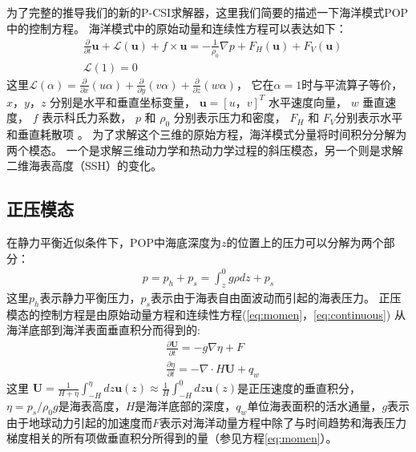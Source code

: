 为了完整的推导我们的新的P-CSI求解器，这里我们简要的描述一下海洋模式POP中的控制方程。
海洋模式中的原始动量和连续性方程可以表达如下：
\begin{align}
&\frac{\partial }{\partial t} \textbf{u} +\mathcal{L}(\textbf{u}) + f\times \textbf{u} = - \frac{1}{\rho_0}\nabla p +F_H(\textbf{u}) +F_V(\textbf{u}) \label{eq:momen}\\
&\mathcal{L}(1) = 0 \label{eq:continuous}
\end{align}
这里$\mathcal{L}(\alpha ) = \frac{\partial }{\partial x} (u\alpha)  +\frac{\partial }{\partial y} (v\alpha) +\frac{\partial }{\partial z} (w\alpha)$， 它在$\alpha =1$时与平流算子等价， $x，y，z$ 分别是水平和垂直坐标变量， $\textbf{u} = [u，v]^T$ 水平速度向量， $w$ 垂直速度， $f$ 表示科氏力系数，  $p$ 和 $\rho_0$ 分别表示压力和密度， $F_H$ 和 $F_V$分别表示水平和垂直耗散项 \citep{smith2010parallel}。  
为了求解这个三维的原始方程，海洋模式分量将时间积分分解为两个模态。 一个是求解三维动力学和热动力学过程的斜压模态，另一个则是求解二维海表高度（SSH）的变化。

\subsection{正压模态} \label{se:baro_mode}


  
在静力平衡近似条件下，POP中海底深度为$z$的位置上的压力可以分解为两个部分：  
\begin{align}
\displaystyle p = p_h + p_s = \int^0_z g\rho dz +p_s
\end{align}
这里$p_h$表示静力平衡压力，$p_s$表示由于海表自由面波动而引起的海表压力。 
正压模态的控制方程是由原始动量方程和连续性方程(\ref{eq:momen}，\ref{eq:continuous}) 从海洋底部到海洋表面垂直积分而得到的:
\begin{align}
&\displaystyle \frac{\partial \textbf{U} }{\partial t}  = -g \nabla \eta + F  \label{eq:baro_mon}\\
&\displaystyle \frac{\partial \eta }{\partial t} = - \nabla \cdot H\textbf{U} + q_w  \label{eq:baro_con}
\end{align}
这里  $\textbf{U} =  \frac{1}{H+\eta}\int_{-H}^\eta dz \textbf{u}(z) \approx \frac{1}{H }\int_{-H}^0 dz \textbf{u}(z)$是正压速度的垂直积分，
$\eta = p_s/{\rho_0g}$是海表高度，$H$是海洋底部的深度，$q_w$单位海表面积的活水通量，$g$表示由于地球动力引起的加速度而$F$表示对海洋动量方程中除了与时间趋势和海表压力梯度相关的所有项做垂直积分所得到的量（参见方程\ref{eq:momen}）。
 
